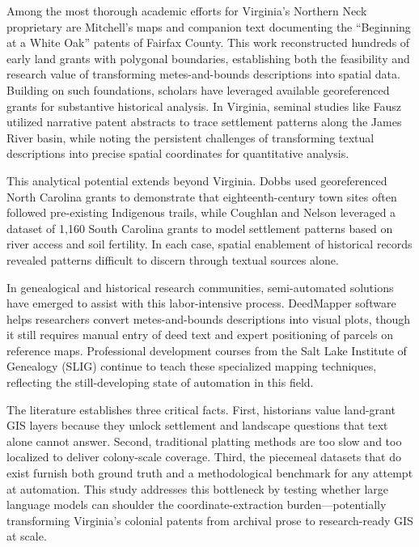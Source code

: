 Among the most thorough academic efforts for Virginia's Northern Neck
proprietary are Mitchell's \citep{mitchell1977whiteoak} maps and
companion text documenting the ``Beginning at a White Oak'' patents of
Fairfax County. This work reconstructed hundreds of early land grants
with polygonal boundaries, establishing both the feasibility and
research value of transforming metes-and-bounds descriptions into
spatial data. Building on such foundations, scholars have leveraged
available georeferenced grants for substantive historical analysis. In
Virginia, seminal studies like Fausz \citep{Fausz1971_settlement}
utilized narrative patent abstracts to trace settlement patterns along
the James River basin, while noting the persistent challenges of
transforming textual descriptions into precise spatial coordinates for
quantitative analysis.

This analytical potential extends beyond Virginia. Dobbs
\citep{Dobbs2009_backcountry} used georeferenced North Carolina grants
to demonstrate that eighteenth-century town sites often followed
pre-existing Indigenous trails, while Coughlan and Nelson
\citep{Coughlan2018_settlement} leveraged a dataset of 1,160 South
Carolina grants to model settlement patterns based on river access and
soil fertility. In each case, spatial enablement of historical records
revealed patterns difficult to discern through textual sources alone.

In genealogical and historical research communities, semi-automated
solutions have emerged to assist with this labor-intensive process.
DeedMapper software \citep{DeedMapper_software} helps researchers
convert metes-and-bounds descriptions into visual plots, though it still
requires manual entry of deed text and expert positioning of parcels on
reference maps. Professional development courses from the Salt Lake
Institute of Genealogy (SLIG) continue to teach these specialized
mapping techniques, reflecting the still-developing state of automation
in this field.

The literature establishes three critical facts. First, historians value
land-grant GIS layers because they unlock settlement and landscape
questions that text alone cannot answer. Second, traditional platting
methods are too slow and too localized to deliver colony-scale coverage.
Third, the piecemeal datasets that do exist furnish both ground truth
and a methodological benchmark for any attempt at automation. This study
addresses this bottleneck by testing whether large language models can
shoulder the coordinate-extraction burden---potentially transforming
Virginia's colonial patents from archival prose to research-ready GIS at
scale.

